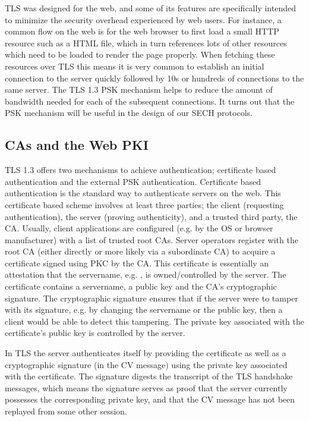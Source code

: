 \ac{TLS} was designed for the web, and some of its
features are specifically intended to minimize
the security overhead experienced by web users.
For instance, a common flow on the web is for the web browser
to first load a small \ac{HTTP} resource such as a \ac{HTML}
file, which in turn references lots of other resources which need
to be loaded to render the page properly.
When fetching these resources over \ac{TLS} this means it is very
common to establish an initial connection to the server
quickly followed by 10s or hundreds of connections to the same server.
The \ac{TLS} 1.3 \ac{PSK} mechanism helps to reduce
the amount of bandwidth needed for each of the subsequent connections.
It turns out that the \ac{PSK} mechanism will be useful in the
design of our \ac{SECH} protocols.

\subsection{CAs and the Web PKI}
\ac{TLS} 1.3 offers two mechanisms to achieve authentication;
certificate based authentication and the external \ac{PSK} authentication.
Certificate based authentication is the standard way
to authenticate servers on the web.
This certificate based scheme involves at least three parties; the client
(requesting authentication), the server (proving authenticity),
and a trusted third party, the \ac{CA}.
Usually, client applications are configured (e.g. by the \ac{OS} or browser
manufacturer) with a list of trusted root \ac{CA}s.
Server operators register with the root \ac{CA}
(either directly or more likely via a subordinate \ac{CA})
to acquire a certificate
signed using \ac{PKC} by the \ac{CA}.
This certificate is essentially an attestation that
the servername, e.g. , is owned/controlled by the server.
The certificate contains a servername, a public key
and the \ac{CA}'s cryptographic signature.
The cryptographic signature ensures that if the server
were to tamper with its signature, e.g. by changing the servername or the public
key,
then a client would be able to detect this tampering.
The private key associated with the certificate's public key is controlled by the server.

In \ac{TLS} the server authenticates itself by providing the certificate
as well as a cryptographic signature (in the \ac{CV} message) using the private key associated with the certificate. The signature digests the transcript of the \ac{TLS} handshake messages, which means the signature serves as proof that the server currently
possesses the corresponding private key,
and that the \ac{CV} message has not been replayed from some other session.

